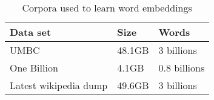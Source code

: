 \begin{table}[h]
\begin{center}
\begin{small}
\begin{tabular}{lll}
\hline
\textbf{Data set} & \textbf{Size} & \textbf{Words} \\ \hline
UMBC 	& 48.1GB & 3 billions \\
One Billion 	& 4.1GB & 0.8 billions  \\
Latest wikipedia dump & 49.6GB & 3 billions \\ \hline
\end{tabular}
\end{small}
\caption{Corpora used to learn word embeddings}
\label{wordEmbedCorpora}
\end{center}
\end{table}

